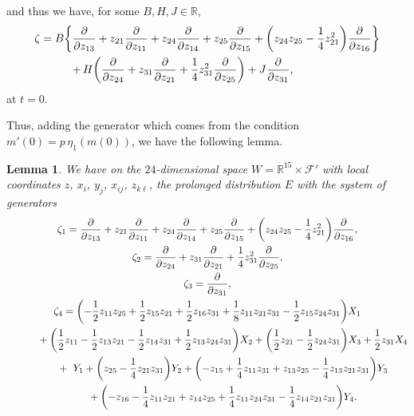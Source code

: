 \documentclass[11pt]{article}
\numberwithin{equation}{section}
\numberwithin{equation}{section}
\newtheorem{Lemma}[Theorem]{Lemma}
\theoremstyle{definition}
\newcommand{\R}{\mathbb{R}}
\newcommand{\0}{\boldsymbol{0}}
\newcommand{\pa}{\partial}
\begin{document}
and thus we have, for some $B, H, J \in \R$,
\begin{align*}
\zeta = B\biggl\{&{} \frac{\pa}{\pa z_{13}} + z_{21}\frac{\pa}{\pa z_{11}} + z_{24}\frac{\pa}{\pa z_{14}} +
z_{25}\frac{\pa}{\pa z_{15}} + \biggl(z_{24}z_{25} - \frac{1}{4}z_{21}^2\biggr)\frac{\pa}{\pa z_{16}}\biggr\}
\vspace{0.3truecm}
\\
&{}
{+}\, H\biggl(\frac{\pa}{\pa z_{24}} + z_{31}\frac{\pa}{\pa z_{21}} + \frac{1}{4}z_{31}^2\frac{\pa}{\pa z_{25}}\biggr) +
J\frac{\pa}{\pa z_{31}},
\end{align*}
at $t = 0$.

Thus, adding the generator which comes from the condition $m'(0) = p\,\eta_1(m(0))$, we have the following lemma.

\begin{Lemma}
\label{Generators-of-E}
We have on the $24$-dimensional
space $W = \R^{15}\times {\mathcal F}'$ with local coordinates $z$, $x_i$, $y_j$, $x_{ij}$, $z_{k\ell}$,
the prolonged distribution $E$ with the system of generators
\begin{gather*}
\zeta_1 = \frac{\pa}{\pa z_{13}} + z_{21}\frac{\pa}{\pa z_{11}} + z_{24}\frac{\pa}{\pa z_{14}} +
z_{25}\frac{\pa}{\pa z_{15}} + \biggl(z_{24}z_{25} - \frac{1}{4}z_{21}^2\biggr)\frac{\pa}{\pa z_{16}},
\\
\zeta_2 = \frac{\pa}{\pa z_{24}} + z_{31}\frac{\pa}{\pa z_{21}} + \frac{1}{4}z_{31}^2\frac{\pa}{\pa z_{25}},
\\
\zeta_3 = \frac{\pa}{\pa z_{31}},
\\
\zeta_4 = \biggl(-\frac{1}{2}z_{11}z_{25} + \frac{1}{2}z_{15}z_{21} + \frac{1}{2}z_{16}z_{31}
+ \frac{1}{8}z_{11}z_{21}z_{31} - \frac{1}{2}z_{15}z_{24}z_{31}\biggr)X_1
\\
\hphantom{\zeta_4 = \biggl(}{}
 + \biggl(\frac{1}{2}z_{11} - \frac{1}{2}z_{13}z_{21} - \frac{1}{2}z_{14}z_{31} + \frac{1}{2}z_{13}z_{24}z_{31}\biggr)X_2
+ \biggl(\frac{1}{2}z_{21} - \frac{1}{2}z_{24}z_{31}\biggr)X_3 + \frac{1}{2}z_{31}X_4
\\
\hphantom{\zeta_4 = \biggl(}{}
 + \ Y_1 + \biggl(z_{25} - \frac{1}{4}z_{21}z_{31}\biggr)Y_2 +
\biggl(-z_{15} + \frac{1}{4}z_{11}z_{31} + z_{13}z_{25} - \frac{1}{4}z_{13}z_{21}z_{31}\biggr)Y_3
\\
\hphantom{\zeta_4 = \biggl(}{}
 + \biggl(-z_{16} - \frac{1}{4}z_{11}z_{21} + z_{14}z_{25} + \frac{1}{4}z_{11}z_{24}z_{31}
- \frac{1}{4}z_{14}z_{21}z_{31}\biggr)Y_4.
\end{gather*}
\end{Lemma}
\end{document}
